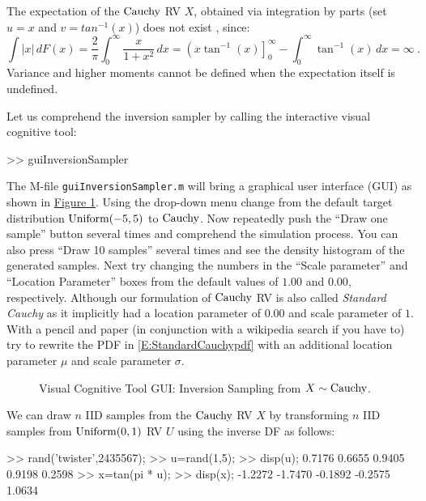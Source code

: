 \begin{example}
The expectation of the $\cauchy$ RV $X$, obtained via integration by parts (set $u=x$ and $v=tan^{-1}(x)$) does not exist  %
, since:
\begin{equation}\label{E:CauchyMeanDoesNotExist}
\int \left|x\right|\,dF(x) = \frac{2}{\pi} \int_0^{\infty} \frac{x}{1+x^2}\,dx = \left(x \tan^{-1}(x) \right]_0^{\infty} - \int_0^{\infty} \tan^{-1}(x)\, dx = \infty \ .
\end{equation}
Variance and higher moments cannot be defined when the expectation itself is undefined.
\end{example}

\begin{labwork}\label{LW:guiInversionSamplerCauchy}
Let us comprehend the inversion sampler by calling the interactive visual cognitive tool:
\begin{VrbM}
>> guiInversionSampler
\end{VrbM}
The M-file {\tt guiInversionSampler.m} will bring a graphical user interface (GUI) as shown in \hyperref[F:guiInversionSamplerCauchy]{Figure \ref*{F:guiInversionSamplerCauchy}}.  Using the drop-down menu change from the default target distribution $\mbox{{\rm Uniform}}(-5,5)$ to $\cauchy$.  Now repeatedly push the ``Draw one sample'' button several times and comprehend the simulation process.  You can also press ``Draw 10 samples'' several times and see the density histogram of the generated samples.  
Next try changing the numbers in the ``Scale parameter'' and ``Location Parameter'' boxes from the default values of $1.00$ and  $0.00$, respectively.  Although our formulation of $\cauchy$ RV is also called {\em Standard Cauchy} as it implicitly had a location parameter of $0.00$ and scale parameter of $1$.  With a pencil and paper (in conjunction with a wikipedia search if you have to) try to rewrite the PDF in \eqref{E:StandardCauchypdf} with an additional location parameter $\mu$ and scale parameter $\sigma$.
\end{labwork}

\begin{figure}[htpb]
\caption{Visual Cognitive Tool GUI: Inversion Sampling from $X \sim \mbox{{\rm Cauchy}}$.\label{F:guiInversionSamplerCauchy}}
\centering   {}
\end{figure}

\begin{simulation}[$\cauchy$]\label{SIM:StdCauchy}
We can draw $n$ IID samples from the $\cauchy$ RV $X$ by transforming $n$ IID samples from $\mbox{{\rm Uniform}}(0,1)$ RV $U$ using the inverse DF as follows:
\begin{VrbM}
>> rand('twister',2435567);        %
>> u=rand(1,5);			%
>> disp(u);			%
    0.7176    0.6655    0.9405    0.9198    0.2598
>> x=tan(pi * u);     %
>> disp(x);  %
   -1.2272   -1.7470   -0.1892   -0.2575    1.0634
\end{VrbM}
\end{simulation}


